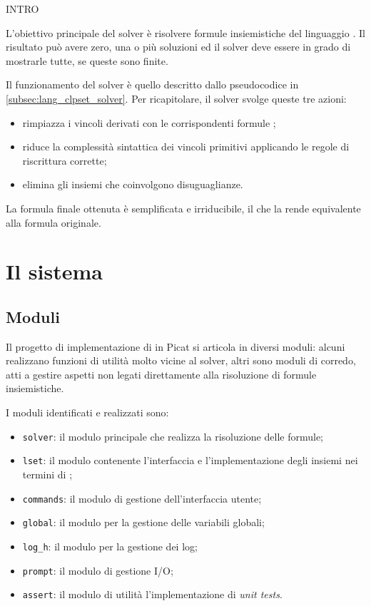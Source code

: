 \documentclass[12pt,a4paper,openright]{book} %
\begin{document}
\minitoc

INTRO

L'obiettivo principale del solver \clpset{} è risolvere formule insiemistiche del linguaggio \clpset{}. Il risultato può avere zero, una o più soluzioni ed il solver deve essere in grado di mostrarle tutte, se queste sono finite.

Il funzionamento del solver è quello descritto dallo pseudocodice in  \ref{subsec:lang_clpset_solver}. Per ricapitolare, il solver svolge queste tre azioni:
\begin{itemize}
\item rimpiazza i vincoli derivati con le corrispondenti formule \clpset{};
\item riduce la complessità sintattica dei vincoli primitivi applicando le regole di riscrittura corrette;
\item elimina gli insiemi che coinvolgono disuguaglianze.
\end{itemize} 
La formula finale ottenuta è semplificata e irriducibile, il che la rende equivalente alla formula originale.

\section{Il sistema}

\subsection{Moduli}

Il progetto di implementazione di \clpset{} in Picat si articola in diversi moduli: alcuni realizzano funzioni di utilità molto vicine al solver, altri sono moduli di corredo, atti a gestire aspetti non legati direttamente alla risoluzione di formule insiemistiche.

I moduli identificati e realizzati sono:
\begin{itemize}
\item \verb|solver|: il modulo principale che realizza la risoluzione delle formule;
\item \verb|lset|: il modulo contenente l'interfaccia e l'implementazione degli insiemi nei termini di \clpset{};
\item \verb|commands|: il modulo di gestione dell'interfaccia utente;
\item \verb|global|: il modulo per la gestione delle variabili globali;
\item \verb|log_h|: il modulo per la gestione dei log;
\item \verb|prompt|: il modulo di gestione I/O;
\item \verb|assert|: il modulo di utilità l'implementazione di \emph{unit tests}.
\end{itemize}
\end{document}
